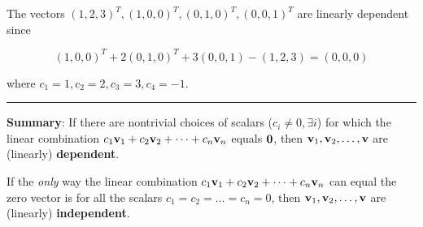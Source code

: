 \begin{example}
The vectors $(1,2,3)^T, (1, 0, 0)^T, (0, 1, 0)^T, (0, 0, 1)^T$ are linearly dependent since  

\[  (1, 0, 0)^T + 2 (0, 1, 0)^T + 3(0, 0, 1) - (1, 2, 3) = (0,0,0)  \]

where $c_1 = 1, c_2 = 2, c_3 = 3, c_4 = -1$.  


 \end{example}
	
	 
\rule[0.01in]{\textwidth}{0.0025in}


 
 
 
 
 
 \begin{tcolorbox}[colback=yellow!10!,colframe=gray!15!]

 \textbf{Summary}:  If there are nontrivial choices of scalars ($c_i \ne 0, \exists i$) for which the linear combination $c_1 {\bf v}_1 + c_2 {\bf v}_2 + \cdots + c_n {\bf v}_n$ equals ${\bf 0}$, then ${\bf v}_1, {\bf v}_2, \dots, {\bf v}$ are (linearly) \textbf{dependent}.   
 
 If the \textit{only} way the linear combination $c_1 {\bf v}_1 + c_2 {\bf v}_2 + \cdots + c_n {\bf v}_n$ can equal the zero vector is for all the scalars $c_1 =  c_2 =  \dots = c_n = 0$, then   ${\bf v}_1, {\bf v}_2, \dots, {\bf v}$ are (linearly) \textbf{independent}.  
 
 \end{tcolorbox}

 
 
 
 
 
 

 

